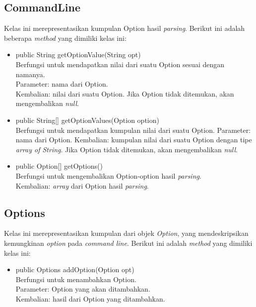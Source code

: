 \subsection{CommandLine}
\label{subsec:commandline}
Kelas ini merepresentasikan kumpulan Option hasil \textit{parsing}.
Berikut ini adalah beberapa \textit{method} yang dimiliki kelas ini: 
\begin{itemize}
\item public String getOptionValue(String opt)\\
Berfungsi untuk mendapatkan nilai dari suatu Option sesuai dengan namanya.\\
Parameter: nama dari Option.\\
Kembalian: nilai dari suatu Option. Jika Option tidak ditemukan, akan mengembalikan \textit{null}.
\item public String[] getOptionValues(Option option)\\
Berfungsi untuk mendapatkan kumpulan nilai dari suatu Option.
Parameter: nama dari Option.
Kembalian: kumpulan nilai dari suatu Option dengan tipe \textit{array of String}. Jika Option tidak ditemukan, akan mengembalikan \textit{null}.
\item public Option[] getOptions()\\
Berfungsi untuk mengembalikan Option-option hasil \textit{parsing}.\\ 
Kembalian: \textit{array} dari Option hasil \textit{parsing}.


\end{itemize}

\subsection{Options}
\label{subsec:options}
Kelas ini merepresentasikan kumpulan dari objek \textit{Option}, yang mendeskripsikan kemungkinan \textit{option} pada \textit{command line}. Berikut ini adalah \textit{method} yang dimiliki kelas ini: 
\begin{itemize}
\item public Options addOption(Option opt)\\
Berfungsi untuk menambahkan Option.\\
Parameter: Option yang akan ditambahkan.\\
Kembalian: hasil dari Option yang ditambahkan.

\end{itemize}


